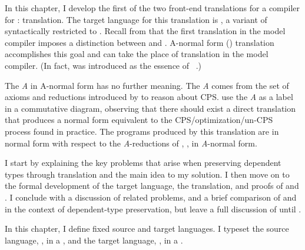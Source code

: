 In this chapter, I develop the first of the two front-end translations for a
 compiler for \slang:  translation.
The target language for this translation is \tlang, a variant of \slang
syntactically restricted to .
Recall from  that the first translation in the model
compiler imposes a distinction between  and .
A-normal form () translation accomplishes this goal and can take the
place of  translation in the model compiler.
(In fact,  was introduced as the essence of
~\cite{flanagan1993}.)

\begin{digression}
  The \emph{A} in A-normal form has no further meaning.
  The \emph{A} comes from the set of axioms and reductions introduced by
  \citet{sabry1992} to reason about CPS.
  \citet{flanagan1993} use the \emph{A} as a label in a commutative diagram,
  observing that there should exist a direct translation that produces a normal
  form equivalent to the CPS/optimization/un-CPS process found in practice.
  The programs produced by this translation are in normal form with respect to
  the \emph{A}-reductions of \citeauthor{sabry1992}, \ie,
  in \emph{A}-normal form.
\end{digression}

I start by explaining the key problems that arise when preserving dependent
types through  translation and the main idea to my solution.
I then move on to the formal development of the target language, the
translation, and proofs of  and .
I conclude with a discussion of related problems, and a brief comparison
of  and  in the context of dependent-type preservation, but
leave a full discussion of  until .

\begin{typographical}
 In this chapter, I define fixed source and target languages.
 I typeset the source language, \slang, in a \emph{}, and the target language, \tlang, in a
 \emph{}.
\end{typographical}
